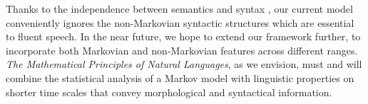 \documentclass[10pt,journal,compsoc]{IEEEtran}
\begin{document}
Thanks to the independence between semantics and syntax \cite{Chomsky2002syntactic}, our current model conveniently ignores the non-Markovian syntactic structures which are essential to  fluent speech.
In the near future, we
hope to extend our framework further, to incorporate both Markovian and non-Markovian features across different ranges. \textit{The Mathematical Principles of Natural Languages}, as we envision, must and will combine the statistical analysis  of a Markov model   with linguistic properties on shorter time scales that convey morphological \cite{Pinker1997WordsRules,MarslenWilson1997,Lieberman2007,Newberry2017} and syntactical \cite{PinkerSurv2000,NowakPlotkinJansen2000,Chomsky2002syntactic,DunnGreenhillLevinsonGray2011,Newberry2017} information.







%


\appendices
\end{document}
